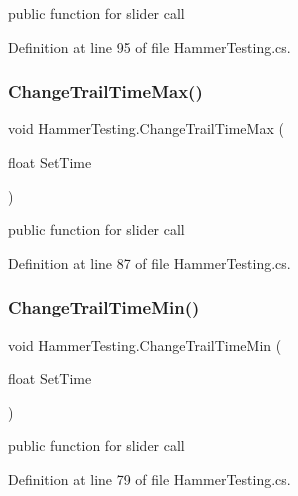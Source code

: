 public function for slider call 



Definition at line 95 of file Hammer\+Testing.\+cs.

\mbox{\label{class_hammer_testing_a36e4790346baa674f372bc75a5108fef}} 
\subsubsection{\texorpdfstring{Change\+Trail\+Time\+Max()}{ChangeTrailTimeMax()}}
{\footnotesize\ttfamily void Hammer\+Testing.\+Change\+Trail\+Time\+Max (\begin{DoxyParamCaption}\item[{float}]{Set\+Time }\end{DoxyParamCaption})}



public function for slider call 



Definition at line 87 of file Hammer\+Testing.\+cs.

\mbox{\label{class_hammer_testing_abaa1e4c02505188080958aaf1283b779}} 
\subsubsection{\texorpdfstring{Change\+Trail\+Time\+Min()}{ChangeTrailTimeMin()}}
{\footnotesize\ttfamily void Hammer\+Testing.\+Change\+Trail\+Time\+Min (\begin{DoxyParamCaption}\item[{float}]{Set\+Time }\end{DoxyParamCaption})}



public function for slider call 



Definition at line 79 of file Hammer\+Testing.\+cs.

\mbox{\label{class_hammer_testing_a028b00573aa72094e4c3adc5dd78e349}} 
